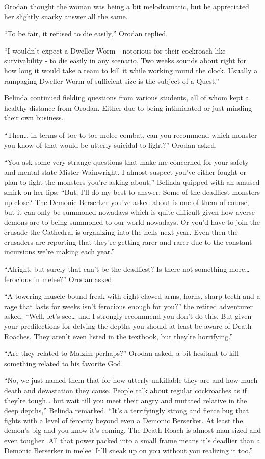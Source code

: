 \documentclass[a4paper,10pt]{book}
\begin{document}
Orodan thought the woman was being a bit melodramatic, but he appreciated her slightly snarky answer all the same.\par
“To be fair, it refused to die easily,” Orodan replied.\par
“I wouldn’t expect a Dweller Worm - notorious for their cockroach-like survivability - to die easily in any scenario. Two weeks sounds about right for how long it would take a team to kill it while working round the clock. Usually a rampaging Dweller Worm of sufficient size is the subject of a Quest.”\par
Belinda continued fielding questions from various students, all of whom kept a healthy distance from Orodan. Either due to being intimidated or just minding their own business.\par
“Then… in terms of toe to toe melee combat, can you recommend which monster you know of that would be utterly suicidal to fight?” Orodan asked.\par
“You ask some very strange questions that make me concerned for your safety and mental state Mister Wainwright. I almost suspect you’ve either fought or plan to fight the monsters you’re asking about,” Belinda quipped with an amused smirk on her lips. “But, I’ll do my best to answer. Some of the deadliest monsters up close? The Demonic Berserker you’ve asked about is one of them of course, but it can only be summoned nowadays which is quite difficult given how averse demons are to being summoned to our world nowadays. Or you’d have to join the crusade the Cathedral is organizing into the hells next year. Even then the crusaders are reporting that they’re getting rarer and rarer due to the constant incursions we’re making each year.”\par
“Alright, but surely that can’t be the deadliest? Is there not something more… ferocious in melee?” Orodan asked.\par
“A towering muscle bound freak with eight clawed arms, horns, sharp teeth and a rage that lasts for weeks isn’t ferocious enough for you?” the retired adventurer asked. “Well, let’s see… and I strongly recommend you don’t do this. But given your predilections for delving the depths you should at least be aware of Death Roaches. They aren’t even listed in the textbook, but they’re horrifying.”\par
“Are they related to Malzim perhaps?” Orodan asked, a bit hesitant to kill something related to his favorite God.\par
“No, we just named them that for how utterly unkillable they are and how much death and devastation they cause. People talk about regular cockroaches as if they’re tough… but wait till you meet their angry and mutated relative in the deep depths,” Belinda remarked. “It’s a terrifyingly strong and fierce bug that fights with a level of ferocity beyond even a Demonic Berserker. At least the demon’s big and you know it’s coming. The Death Roach is almost man-sized and even tougher. All that power packed into a small frame means it’s deadlier than a Demonic Berserker in melee. It’ll sneak up on you without you realizing it too.”\par
\end{document}
